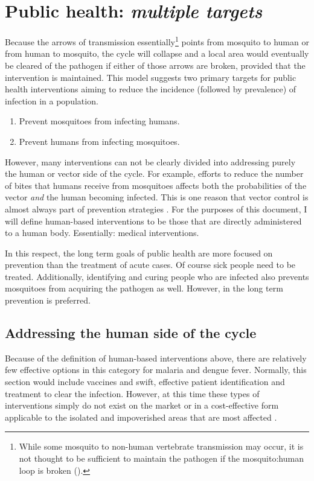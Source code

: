\section{Public health: \emph{multiple targets}}

Because the arrows of transmission essentially\footnote{While some mosquito
  to non-human vertebrate transmission may occur, it is not thought to
  be sufficient to maintain the pathogen if the mosquito:human loop is
  broken (\CITEME).}
points from mosquito to human or from human to mosquito, the cycle will collapse and a local area would eventually be cleared of the pathogen if either of those arrows are broken, provided that the intervention is maintained.
This model suggests two primary targets for public health interventions aiming to reduce the \gls{incidence}
(followed by \gls{prevalence}) of infection in a population.

\begin{enumerate}
\item Prevent mosquitoes from infecting humans.
\item Prevent humans from infecting mosquitoes.
\end{enumerate}

However, many interventions can not be clearly divided into addressing purely the human or vector side of the cycle.
For example, efforts to reduce the number of bites that humans receive from mosquitoes affects both the probabilities of the vector \emph{and} the human becoming infected.
This is one reason that vector control is almost always part of prevention strategies \CITEME.
For the purposes of this document, I will define human-based interventions to be those that are directly administered to a human body.
Essentially: medical interventions.

In this respect, the long term goals of public health are more focused on prevention than the treatment of acute cases.
Of course sick people need to be treated. Additionally, identifying and curing people who are infected also prevents mosquitoes from acquiring the pathogen as well.
However, in the long term prevention is preferred.


\subsection{Addressing the human side of the cycle}

Because of the definition of human-based interventions above, there are relatively few effective options in this category for malaria and dengue fever.
Normally, this section would include vaccines and swift, effective patient identification and treatment to clear the infection.
However, at this time these types of interventions simply do not exist on the market or in a cost-effective form applicable to the isolated and impoverished areas that are most affected \CITEME.

